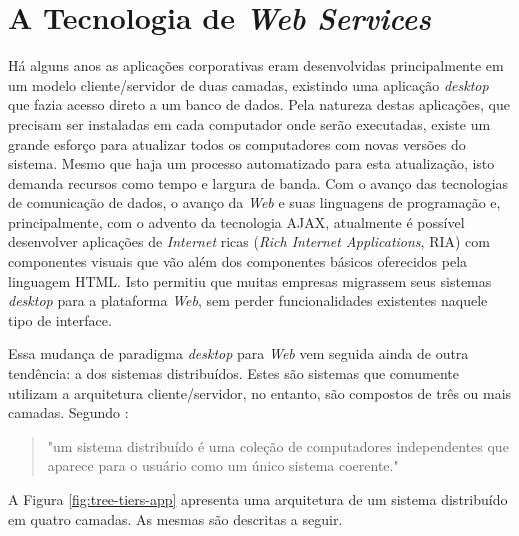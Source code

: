\section{A Tecnologia de \textit{Web Services}}  \label{cap:ws}

Há alguns anos as aplicações corporativas eram desenvolvidas principalmente em um modelo cliente/servidor de duas camadas, existindo uma aplicação \textit{desktop} que fazia acesso direto a um banco de dados. Pela natureza destas aplicações, que precisam ser instaladas em cada computador onde serão executadas, existe um grande esforço para atualizar todos os computadores com novas versões do sistema. Mesmo que haja um processo automatizado para esta atualização, isto demanda recursos como tempo e largura de banda. Com o avanço das tecnologias de comunicação de dados, o avanço da \textit{Web} e suas linguagens de programação e, principalmente, com o advento da tecnologia AJAX, atualmente é possível desenvolver aplicações de \textit{Internet} ricas (\textit{Rich Internet Applications}, RIA) com componentes visuais que vão além dos componentes básicos oferecidos pela linguagem HTML. Isto permitiu que muitas empresas migrassem seus sistemas \textit{desktop} para a plataforma \textit{Web}, sem perder funcionalidades existentes naquele tipo de interface.

Essa mudança de paradigma \textit{desktop} para \textit{Web} vem seguida ainda de outra tendência: a dos sistemas distribuídos. 
Estes são sistemas que comumente utilizam a arquitetura cliente/servidor, no entanto, são compostos de três ou mais camadas. 
Segundo \cite{sommerville2011soft}:
\begin{quote}
"um sistema distribuído é uma coleção de computadores independentes que aparece para o usuário como um único sistema coerente."
\end{quote}

A Figura \ref{fig:tree-tiers-app} apresenta uma arquitetura de um sistema distribuído em quatro camadas. As mesmas são descritas a seguir.

